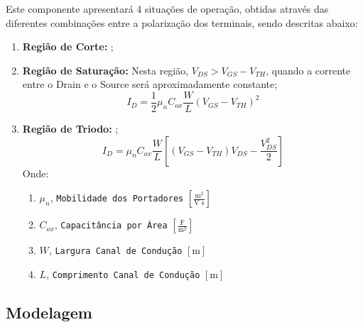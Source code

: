\documentclass{article}
\begin{document}
            Este componente apresentará 4 situações de operação, obtidas através das diferentes combinações entre a polarização dos terminais, sendo descritas abaixo:
                \begin{enumerate}[rightmargin = \leftmargin]
                    \item \textbf{Região de Corte:} ;
                    \item \textbf{Região de Saturação:} Nesta região, $V_{DS} > V_{GS} - V_{TH}$, quando a corrente entre o Drain e o Source será aproximadamente constante;
                        \begin{equation}
                            \boxed{
                                I_{D} = \frac{1}{2} \mu_{n} C_{ox} \frac{W}{L} (V_{GS} - V_{TH})^{2}
                            }
                        \end{equation}
                    \item \textbf{Região de Triodo:} ;
                        \begin{equation}
                            \boxed{
                                I_{D} = \mu_{n} C_{ox} \frac{W}{L}
                                \left[
                                    (V_{GS} - V_{TH})V_{DS} - \frac{V_{DS}^{2}}{2}
                                \right]
                            }
                        \end{equation}
                    Onde:
                        \begin{enumerate}[rightmargin = \leftmargin, noitemsep]
                            \item $\mu_{n}$, \texttt{Mobilidade dos Portadores} $[\frac{\text{m}^{2}}{\text{V s}}]$
                            \item $C_{ox}$, \texttt{Capacitância por Área} $[\frac{\text{F}}{\text{m}^{2}}]$
                            \item $W$, \texttt{Largura Canal de Condução} $[\text{m}]$
                            \item $L$, \texttt{Comprimento Canal de Condução} $[\text{m}]$
                        \end{enumerate}
                \end{enumerate}

        \subsection{Modelagem}
\end{document}
